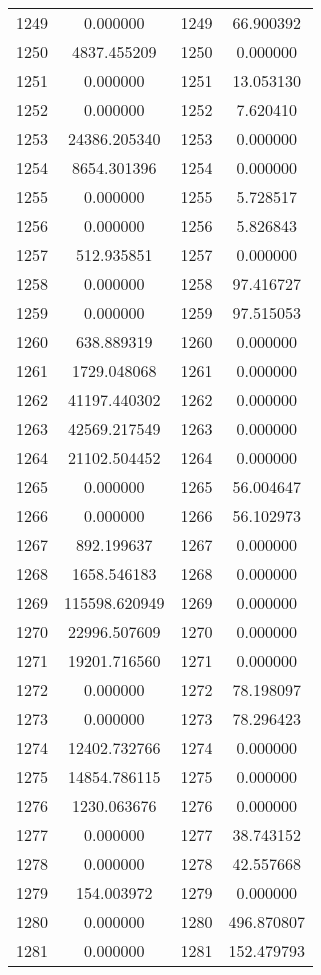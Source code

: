 \documentclass[12pt]{article}
\begin{document}
\begin{longtable}{@{}cccc@{}}
1249 & 0.000000 & 1249 & 66.900392 \\
1250 & 4837.455209 & 1250 & 0.000000 \\
1251 & 0.000000 & 1251 & 13.053130 \\
1252 & 0.000000 & 1252 & 7.620410 \\
1253 & 24386.205340 & 1253 & 0.000000 \\
1254 & 8654.301396 & 1254 & 0.000000 \\
1255 & 0.000000 & 1255 & 5.728517 \\
1256 & 0.000000 & 1256 & 5.826843 \\
1257 & 512.935851 & 1257 & 0.000000 \\
1258 & 0.000000 & 1258 & 97.416727 \\
1259 & 0.000000 & 1259 & 97.515053 \\
1260 & 638.889319 & 1260 & 0.000000 \\
1261 & 1729.048068 & 1261 & 0.000000 \\
1262 & 41197.440302 & 1262 & 0.000000 \\
1263 & 42569.217549 & 1263 & 0.000000 \\
1264 & 21102.504452 & 1264 & 0.000000 \\
1265 & 0.000000 & 1265 & 56.004647 \\
1266 & 0.000000 & 1266 & 56.102973 \\
1267 & 892.199637 & 1267 & 0.000000 \\
1268 & 1658.546183 & 1268 & 0.000000 \\
1269 & 115598.620949 & 1269 & 0.000000 \\
1270 & 22996.507609 & 1270 & 0.000000 \\
1271 & 19201.716560 & 1271 & 0.000000 \\
1272 & 0.000000 & 1272 & 78.198097 \\
1273 & 0.000000 & 1273 & 78.296423 \\
1274 & 12402.732766 & 1274 & 0.000000 \\
1275 & 14854.786115 & 1275 & 0.000000 \\
1276 & 1230.063676 & 1276 & 0.000000 \\
1277 & 0.000000 & 1277 & 38.743152 \\
1278 & 0.000000 & 1278 & 42.557668 \\
1279 & 154.003972 & 1279 & 0.000000 \\
1280 & 0.000000 & 1280 & 496.870807 \\
1281 & 0.000000 & 1281 & 152.479793 \\

\end{longtable}
\end{document}
